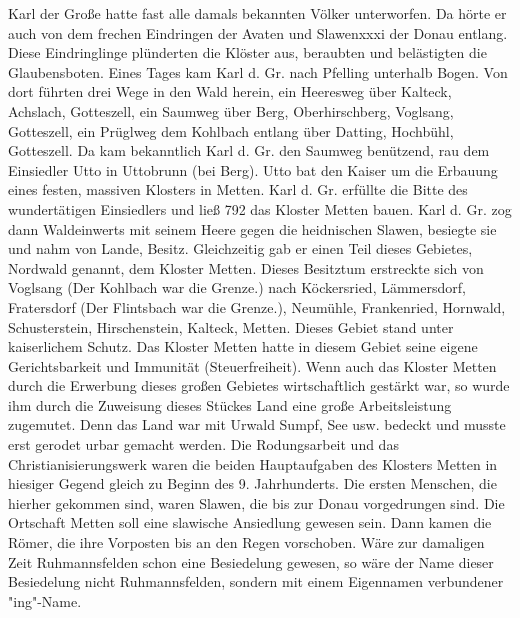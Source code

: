 \documentclass{book}
\begin{document}
Karl der Große hatte fast alle damals bekannten Völker unterworfen. Da hörte er
auch von dem frechen Eindringen der Avaten und Slawenxxxi der Donau entlang.
Diese Eindringlinge plünderten die Klöster aus, beraubten und belästigten die
Glaubensboten. Eines Tages kam Karl d. Gr. nach Pfelling unterhalb Bogen. Von
dort führten drei Wege in den Wald herein, ein Heeresweg über Kalteck, Achslach,
Gotteszell, ein Saumweg über Berg, Oberhirschberg, Voglsang, Gotteszell, ein
Prüglweg dem Kohlbach entlang über Datting, Hochbühl, Gotteszell. Da kam
bekanntlich Karl d. Gr. den Saumweg benützend, rau dem Einsiedler Utto in
Uttobrunn (bei Berg). Utto bat den Kaiser um die Erbauung eines festen, massiven
Klosters in Metten. Karl d. Gr. erfüllte die Bitte des wundertätigen Einsiedlers
und ließ 792 das Kloster Metten bauen. Karl d. Gr. zog dann Waldeinwerts mit
seinem Heere gegen die heidnischen Slawen, besiegte sie und nahm von Lande,
Besitz. Gleichzeitig gab er einen Teil dieses Gebietes, Nordwald genannt, dem
Kloster Metten. Dieses Besitztum erstreckte sich von Voglsang (Der Kohlbach war
die Grenze.) nach Köckersried, Lämmersdorf, Fratersdorf (Der Flintsbach war die
Grenze.), Neumühle, Frankenried, Hornwald, Schusterstein, Hirschenstein,
Kalteck, Metten. Dieses Gebiet stand unter kaiserlichem Schutz. Das Kloster
Metten hatte in diesem Gebiet seine eigene Gerichtsbarkeit und Immunität
(Steuerfreiheit). Wenn auch das Kloster Metten durch die Erwerbung dieses großen
Gebietes wirtschaftlich gestärkt war, so wurde ihm durch die Zuweisung dieses
Stückes Land eine große Arbeitsleistung zugemutet. Denn das Land war mit Urwald
Sumpf, See usw. bedeckt und musste erst gerodet urbar gemacht werden. Die
Rodungsarbeit und das Christianisierungswerk waren die beiden Hauptaufgaben des
Klosters Metten in hiesiger Gegend gleich zu Beginn des 9. Jahrhunderts. Die
ersten Menschen, die hierher gekommen sind, waren Slawen, die bis zur Donau
vorgedrungen sind. Die Ortschaft Metten soll eine slawische Ansiedlung gewesen
sein. Dann kamen die Römer, die ihre Vorposten bis an den Regen vorschoben. Wäre
zur damaligen Zeit Ruhmannsfelden schon eine Besiedelung gewesen, so wäre der
Name dieser Besiedelung nicht Ruhmannsfelden, sondern mit einem Eigennamen
verbundener "ing"-Name.
\end{document}
